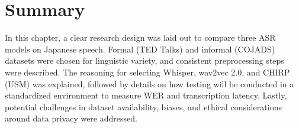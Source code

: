 \section{Summary}
In this chapter, a clear research design was laid out to compare three ASR models on Japanese speech. Formal (TED Talks) and informal (COJADS) datasets were chosen for linguistic variety, and consistent preprocessing steps were described. The reasoning for selecting Whisper, wav2vec 2.0, and CHIRP (USM) was explained, followed by details on how testing will be conducted in a standardized environment to measure WER and transcription latency. Lastly, potential challenges in dataset availability, biases, and ethical considerations around data privacy were addressed.